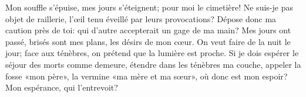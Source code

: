 Mon souffle s’épuise, mes jours s’éteignent;
	pour moi le cimetière!
Ne suis-je pas objet de raillerie,
	l’œil tenu éveillé par leurs provocations?
Dépose donc ma caution près de toi:
	qui d’autre accepterait un gage de ma main?
Mes jours ont passé, brisés sont mes plans, les désirs de mon cœur.
On veut faire de la nuit le jour;
	face aux ténèbres, on prétend que la lumière est proche.
Si je dois espérer le séjour des morts comme demeure,
	étendre dans les ténèbres ma couche,
	appeler la fosse «mon père», la vermine «ma mère et ma sœur»,
	où donc est mon espoir?
	Mon espérance, qui l’entrevoit?
